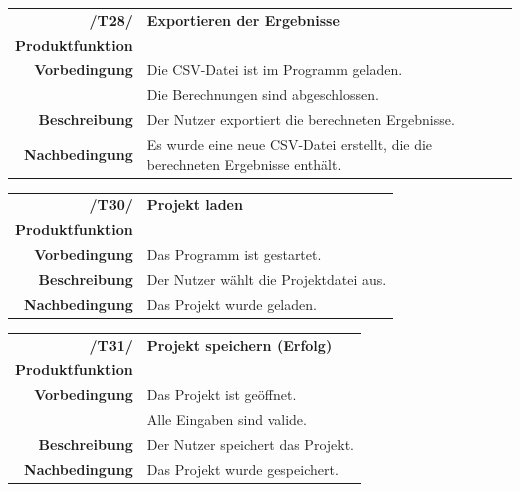 \documentclass{article}
\begin{document}
\begin{table}[H]
\begin{tabularx}{\textwidth}{rX} \vspace{1mm}
\textbf{/T28/}         & \textbf{Exportieren der Ergebnisse}  \\ \vspace{1mm}
\textbf{Produktfunktion} & \nameref{sec:f:Ergebnisse exportieren} \\
\textbf{Vorbedingung}  & Die CSV-Datei ist im Programm geladen. \\ \vspace{1mm} & Die Berechnungen sind abgeschlossen.   \\ \vspace{1mm}
\textbf{Beschreibung}  & Der Nutzer exportiert die berechneten Ergebnisse. \\
\textbf{Nachbedingung} & Es wurde eine neue CSV-Datei erstellt, die die berechneten Ergebnisse enthält.
\end{tabularx}
\end{table}

\begin{table}[H]
\begin{tabularx}{\textwidth}{rX}
 \vspace{1mm}
\textbf{/T30/}         & \textbf{Projekt laden} \\ \vspace{1mm}
\textbf{Produktfunktion} & \nameref{sec:f:Projekt laden} \\ \vspace{1mm}
\textbf{Vorbedingung}  & Das Programm ist gestartet.   \\ \vspace{1mm}
\textbf{Beschreibung}  & Der Nutzer wählt die Projektdatei aus. \\
\textbf{Nachbedingung} & Das Projekt wurde geladen.
\end{tabularx}
\end{table}

\begin{table}[H]
\begin{tabularx}{\textwidth}{rX}
 \vspace{1mm}
\textbf{/T31/}         & \textbf{Projekt speichern (Erfolg)} \\ \vspace{1mm}
\textbf{Produktfunktion} & \nameref{sec:f:Projekt speichern} \\
\textbf{Vorbedingung}  & Das Projekt ist geöffnet.   \\ \vspace{1mm} & Alle Eingaben sind valide. \\ \vspace{1mm}
\textbf{Beschreibung}  & Der Nutzer speichert das Projekt. \\
\textbf{Nachbedingung} & Das Projekt wurde gespeichert.
\end{tabularx}
\end{table}
\end{document}
